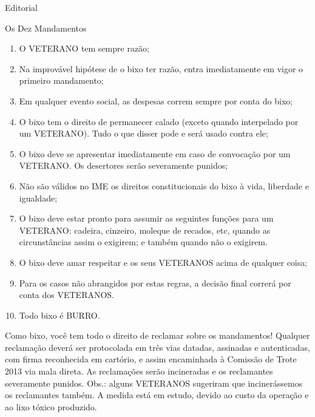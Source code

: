 \begin{secao}{Editorial}
\begin{subsecao}{Os Dez Mandamentos}
  \begin{enumerate}
  \item O VETERANO tem sempre razão;
  \item Na improvável hipótese de o bixo ter razão, entra imediatamente
        em vigor o primeiro mandamento;
  \item Em qualquer evento social, as despesas correm sempre por conta
        do bixo;
  \item O bixo tem o direito de permanecer calado (exceto quando interpelado
        por um VETERANO). Tudo o que disser pode e será usado contra ele;
  \item O bixo deve se apresentar imediatamente em caso de convocação por
        um VETERANO. Os desertores serão severamente punidos;
  \item Não são válidos no IME os direitos constitucionais do bixo à vida,
        liberdade e igualdade;
  \item O bixo deve estar pronto para assumir as seguintes funções para um
        VETERANO: cadeira, cinzeiro, moleque de recados, etc, quando as
        circunstâncias assim o exigirem; e também quando não o exigirem.
  \item O bixo deve amar respeitar e os seus VETERANOS acima de qualquer
        coisa;
  \item Para os casos não abrangidos por estas regras, a decisão final
        correrá por conta dos VETERANOS.
  \item Todo bixo é BURRO.
  \end{enumerate}

  
Como bixo, você tem todo o direito de reclamar sobre os mandamentos! Qualquer
reclamação deverá ser protocolada em três vias datadas, assinadas e autenticadas,
com firma reconhecida em cartório, e assim encaminhada à Comissão de Trote 2013
via mala direta. As reclamações serão incineradas e os reclamantes severamente
punidos. Obs.: alguns VETERANOS sugeriram que incinerássemos os reclamantes também.
A medida está em estudo, devido ao custo da operação e ao lixo tóxico produzido.


\end{subsecao}
\end{secao}
